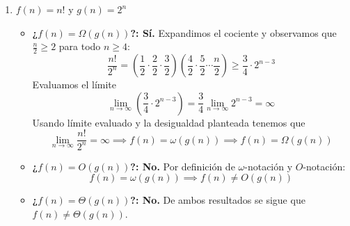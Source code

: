 \begin{enumerate}
\begin{itemize}
        \item \textbf{¿$f(n) = \Theta(g(n))$?: No.}  
        De ambos resultados se sigue que $f(n) \neq \Theta(g(n))$.
    \end{itemize}

    \item $f(n) = n!$ y $g(n) = 2^n$
    \begin{itemize}
    
        \item \textbf{¿$f(n) = \Omega(g(n))$?: Sí.}  
        Expandimos el cociente y observamos que $\frac{n}{2} \ge 2$ para todo $n \ge 4$:
        \[
        \frac{n!}{2^n} = \left(\frac{1}{2} \cdot \frac{2}{2} \cdot \frac{3}{2}\right) \left(\frac{4}{2} \cdot \frac{5}{2} \cdots \frac{n}{2}\right) \ge \frac{3}{4} \cdot 2^{n-3}
        \]
        Evaluamos el límite
        \[
        \lim_{n \to \infty} \left(\frac{3}{4} \cdot 2^{n-3}\right) = \frac{3}{4} \lim_{n \to \infty} 2^{n-3} = \infty
        \]
        Usando límite evaluado y la desigualdad planteada tenemos que
        \[
        \lim_{n \to \infty} \frac{n!}{2^n} = \infty \implies f(n) = \omega(g(n)) \implies f(n) = \Omega(g(n))
        \]

        \item \textbf{¿$f(n) = O(g(n))$?: No.}  
        Por definición de $\omega$-notación y $O$-notación:
        \[
        f(n) = \omega(g(n)) \implies f(n) \neq O(g(n))
        \]
    
        \item \textbf{¿$f(n) = \Theta(g(n))$?: No.}  
        De ambos resultados se sigue que $f(n) \neq \Theta(g(n))$. \cite{clrs2022}
    \end{itemize}

\end{enumerate}

